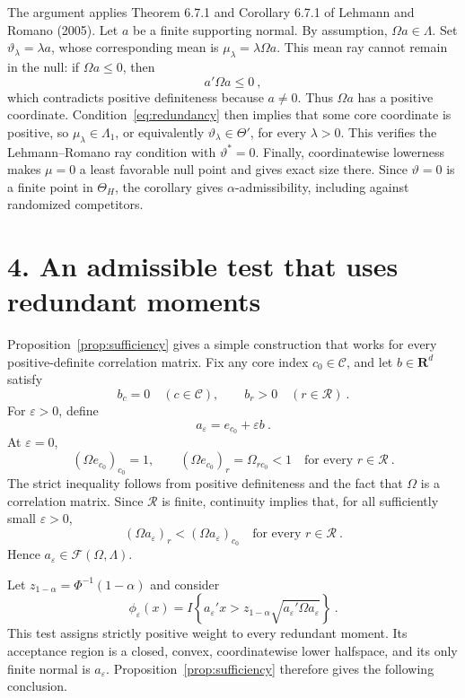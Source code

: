 \documentclass[12pt]{article}
\theoremstyle{remark}
\begin{document}
The argument applies Theorem 6.7.1 and Corollary 6.7.1 of Lehmann and Romano (2005).  Let $a$ be a finite supporting normal.  By assumption, $\Omega a\in\Lambda$.  Set $\vartheta_\lambda=\lambda a$, whose corresponding mean is $\mu_\lambda=\lambda\Omega a$.  This mean ray cannot remain in the null: if $\Omega a\le0$, then
\[
a'\Omega a\le0~,
\]
which contradicts positive definiteness because $a\ne0$.  Thus $\Omega a$ has a positive coordinate.  Condition~\eqref{eq:redundancy} then implies that some core coordinate is positive, so $\mu_\lambda\in\Lambda_1$, or equivalently $\vartheta_\lambda\in\Theta'$, for every $\lambda>0$.  This verifies the Lehmann--Romano ray condition with $\vartheta^*=0$.  Finally, coordinatewise lowerness makes $\mu=0$ a least favorable null point and gives exact size there.  Since $\vartheta=0$ is a finite point in $\Theta_H$, the corollary gives $\alpha$-admissibility, including against randomized competitors.

\section*{4. An admissible test that uses redundant moments}

Proposition~\ref{prop:sufficiency} gives a simple construction that works for every positive-definite correlation matrix.  Fix any core index $c_0\in\mathcal C$, and let $b\in\mathbf R^d$ satisfy
\[
b_c=0\quad(c\in\mathcal C),
\qquad
b_r>0\quad(r\in\mathcal R)~.
\]
For $\varepsilon>0$, define
\[
a_\varepsilon=e_{c_0}+\varepsilon b~.
\]
At $\varepsilon=0$,
\[
(\Omega e_{c_0})_{c_0}=1,
\qquad
(\Omega e_{c_0})_r=\Omega_{r c_0}<1
\quad\text{for every }r\in\mathcal R~.
\]
The strict inequality follows from positive definiteness and the fact that $\Omega$ is a correlation matrix.  Since $\mathcal R$ is finite, continuity implies that, for all sufficiently small $\varepsilon>0$,
\[
(\Omega a_\varepsilon)_r
<
(\Omega a_\varepsilon)_{c_0}
\quad\text{for every }r\in\mathcal R~.
\]
Hence $a_\varepsilon\in\mathcal F(\Omega,\Lambda)$.

Let $z_{1-\alpha}=\Phi^{-1}(1-\alpha)$ and consider
\begin{equation}\label{eq:augmented-test}
\phi_\varepsilon(x)
=
I\left\{
a_\varepsilon'x>
z_{1-\alpha}\sqrt{a_\varepsilon'\Omega a_\varepsilon}
\right\}~.
\end{equation}
This test assigns strictly positive weight to every redundant moment.  Its acceptance region is a closed, convex, coordinatewise lower halfspace, and its only finite normal is $a_\varepsilon$.  Proposition~\ref{prop:sufficiency} therefore gives the following conclusion.
\end{document}
